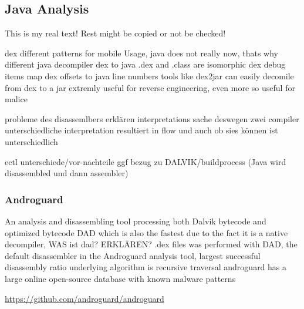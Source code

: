 \subsection{Java Analysis} \label{subsection:forensics-tools-java}
This is my real text! Rest might be copied or not be checked!

dex different patterns for mobile Usage, java does not really now, thats why different java decompiler
%
dex to java
.dex and .class are isomorphic
dex debug items map dex offsets to java line numbers
tools like dex2jar can easily decomile from dex to a jar
extremly useful for reverse engineering, even more so useful for malice\newline

probleme des disassemlbers erklären\newline
interpretations sache\newline
deswegen zwei compiler\newline
unterschiedliche interpretation resultiert in flow und auch ob sies können ist unterschiedlich\newline

ectl unterschiede/vor-nachteile\newline
ggf bezug zu DALVIK/buildprocess (Java wird disassembled und dann assembler)\newline

\subsubsection{Androguard}
An analysis and disassembling tool processing both Dalvik bytecode and optimized bytecode\newline
DAD which is also the fastest due to the fact it is a native decompiler, WAS ist dad? ERKLÄREN? .dex files was performed with DAD, the default disassembler
in the Androguard analysis tool, largest successful disassembly
ratio\newline
underlying algorithm is recursive traversal\newline
androguard has a large online open-source database with known malware patterns\newline
\cite{kovachevaMaster}
%




\url{https://github.com/androguard/androguard}

